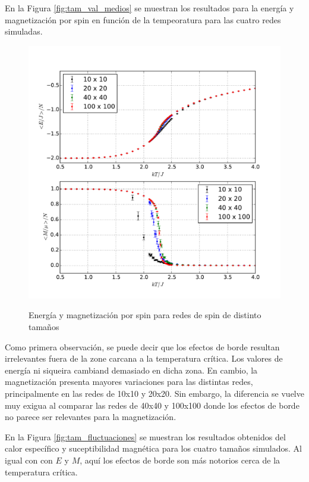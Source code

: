 \documentclass[a4paper,12pt]{article}
\begin{document}
En la Figura \eqref{fig:tam_val_medios} se muestran los resultados para la 
energía y magnetización por spin en función de la tempeoratura para las cuatro 
redes simuladas.

\begin{figure}[H]
    \begin{center}
      \includegraphics[scale=0.7]{tamano_val_medios.pdf} \\
      \caption{Energía y magnetización por spin para redes de spin de distinto 
      tamaños}\label{fig:tam_val_medios}
    \end{center}
\end{figure}

Como primera observación, se puede decir que los efectos de borde resultan 
irrelevantes fuera de la zone carcana a la temperatura crítica. Los valores de 
energía ni siqueira cambiand demasiado en dicha zona. En cambio, la 
magnetización presenta mayores variaciones para las distintas redes, 
principalmente en las redes de 10x10 y 20x20. Sin embargo, la diferencia se 
vuelve muy exigua al comparar las redes de 40x40 y 100x100 donde los efectos de 
borde no parece ser relevantes para la magnetización.

En la Figura \eqref{fig:tam_fluctuaciones} se muestran los resultados obtenidos 
del calor específico y suceptibilidad magnética para los cuatro tamaños 
simulados. Al igual con con $E$ y $M$, aquí los efectos de borde son más 
notorios cerca de la temperatura crítica.
\end{document}
